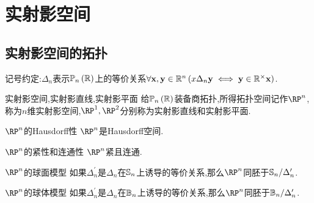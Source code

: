 \chapter{实射影空间}

\section{实射影空间的拓扑}

记号约定:$\Delta_{n}$表示$\mathbb{P}_{n}\left(\R\right)$上的等价关系$\forall\mathbf{x},\mathbf{y}\in\R^{n}\left(x\Delta_{n}\mathbf{y}\iff \mathbf{y}\in\R^{\times}\mathbf{x}\right)$.

\begin{definition}{实射影空间,实射影直线,实射影平面}{}
	给$\mathbb{P}_{n}\left(\R\right)$装备商拓扑,所得拓扑空间记作$\RP^{n}$,称为$n$维实射影空间,$\RP^{1},\RP^{2}$分别称为实射影直线和实射影平面.
\end{definition}

\begin{proposition}{$\RP^{n}$的Hausdorff性}{}
	$\RP^{n}$是Hausdorff空间.
\end{proposition}

\begin{proposition}{$\RP^{n}$的紧性和连通性}{}
	$\RP^{n}$紧且连通.
\end{proposition}

\begin{proposition}{$\RP^{n}$的球面模型}{}
	如果$\Delta_{n}^{\prime}$是$\Delta_{n}$在$\S_{n}$上诱导的等价关系,那么$\RP^{n}$同胚于$\S_{n}/\Delta_{n}^{\prime}$.
\end{proposition}

\begin{proposition}{$\RP^{n}$的球体模型}{}
	如果$\Delta_{n}^{\prime}$是$\Delta_{n}$在$\B_{n}$上诱导的等价关系,那么$\RP^{n}$同胚于$\B_{n}/\Delta_{n}^{\prime}$.
\end{proposition}